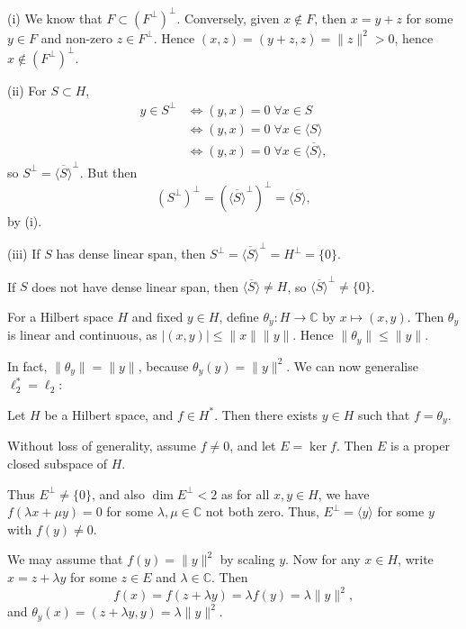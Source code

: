 \documentclass[12pt]{article}
\begin{document}
\begin{proofbox}
	(i) We know that $F \subset (F^{\perp})^{\perp}$. Conversely, given $x \not \in F$, then $x = y + z$ for some $y \in F$ and non-zero $z \in F^{\perp}$. Hence $(x, z) = (y + z, z) = \|z\|^2 > 0$, hence $x \not \in (F^{\perp})^{\perp}$.

	(ii) For $S \subset H$,
	\begin{align*}
		y \in S^{\perp} &\iff (y, x) = 0 \;\forall x \in S \\
				&\iff (y, x) = 0 \;\forall x \in \langle S \rangle \\
				&\iff (y, x) = 0 \;\forall x \in \overline{\langle S\rangle},
	\end{align*}
	so $S^{\perp} = \overline{\langle S \rangle}^{\perp}$. But then
	\[
		(S^{\perp})^{\perp} = (\overline{\langle S \rangle}^{\perp})^{\perp} = \overline{\langle S \rangle},
	\]
	by (i).

	(iii) If $S$ has dense linear span, then $S^{\perp} = \overline{\langle S\rangle}^{\perp} = H^{\perp} = \{0\}$.

	If $S$ does not have dense linear span, then $\overline{\langle S \rangle} \neq H$, so $\overline{\langle S \rangle}^{\perp} \neq \{0\}$.
\end{proofbox}

For a Hilbert space $H$ and fixed $y \in H$, define $\theta_y : H \to \mathbb{C}$ by $x \mapsto (x, y)$. Then $\theta_y$ is linear and continuous, as $|(x, y)| \leq \|x\|\|y\|$. Hence $\|\theta_y\| \leq \|y\|$.

In fact, $\|\theta_y\| = \|y\|$, because $\theta_y(y) = \|y\|^2$. We can now generalise $\ell_2^{\ast} = \ell_2$:

\begin{theorem}
	Let $H$ be a Hilbert space, and $f \in H^{\ast}$. Then there exists $y \in H$ such that $f = \theta_y$.
\end{theorem}

\begin{proofbox}
	Without loss of generality, assume $f \neq 0$, and let $E = \ker f$. Then $E$ is a proper closed subspace of $H$.

	Thus $E^{\perp} \neq \{0\}$, and also $\dim E^{\perp} < 2$ as for all $x, y \in H$, we have $f(\lambda x + \mu y) = 0$ for some $\lambda, \mu \in \mathbb{C}$ not both zero. Thus, $E^{\perp} = \langle y \rangle$ for some $y$ with $f(y) \neq 0$.

	We may assume that $f(y) = \|y\|^2$ by scaling $y$. Now for any $x \in H$, write $x = z + \lambda y$ for some $z \in E$ and $\lambda \in \mathbb{C}$. Then
	\[
	f(x) = f(z + \lambda y) = \lambda f(y) = \lambda \|y\|^2,
	\]
	and $\theta_y(x) = (z + \lambda y, y) = \lambda \|y\|^2$.
\end{proofbox}
\end{document}
